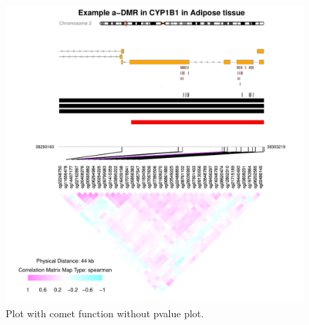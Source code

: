 \documentclass[11pt]{article}\usepackage[]{graphicx}\usepackage[usenames,dvipsnames]{color}
\makeatletter
\def\maxwidth{ %
  \ifdim\Gin@nat@width>\linewidth
    \linewidth
  \else
    \Gin@nat@width
  \fi
}
\newenvironment{knitrout}{}{} %
\makeatother
\begin{document}
\begin{figure}
\begin{knitrout}
\color{fgcolor}

{\centering \includegraphics[width=\maxwidth]{figure/minimal-cometPlot_nopval} 

}



\end{knitrout}
\caption{Plot with comet function without pvalue plot.\label{fig:cometPlot_nopval}}
\end{figure}


\clearpage
\end{document}
